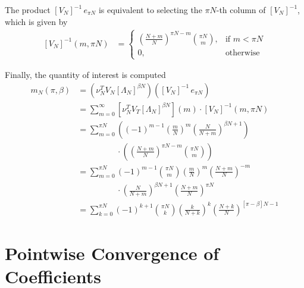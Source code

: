 \documentclass{article}
\newcommand{\ppar}[1]{\left( #1 \right)}
\newcommand{\spar}[1]{\left[ #1 \right]}
\begin{document}
The product $\spar{V_N}^{-1}\,e_{\pi N}$ is equivalent to selecting the $\pi N$-th column of $\spar{V_N}^{-1}$, which is given by
\begin{align}
\spar{V_N}^{-1}(m, \pi N)
    &=
    \begin{cases}
        \ppar{\frac{N+m}{N}}^{\pi N-m} \binom{\pi N}{m},
        &\text{if } m<\pi N \\
        0, &\text{otherwise}
    \end{cases}
\end{align}


Finally, the quantity of interest is computed
\begin{align*}
    m_N(\pi, \beta) 
    &=
    \ppar{\nu_N^T V_N \spar{\Lambda_N}^{\beta N}} \ppar{\spar{V_N}^{-1}\,e_{\pi N}}
    \\
    &=
    \sum_{m=0}^\infty 
    \spar{\nu_N^T V_T \spar{\Lambda_N}^{\beta N}}(m) \cdot
    \spar{V_N}^{-1}(m, \pi N)
    \\
    &=
    \sum_{m=0}^{\pi N}
    \ppar{(-1)^{m-1} \ppar{\frac{m}{N}}^m
    \ppar{\frac{N}{N+m}}^{\beta N+1}}
    \\
    &\phantom{=}
    \phantom{\sum_{m=0}^{\pi N}} \cdot
    \ppar{\ppar{\frac{N+m}{N}}^{\pi N-m} \binom{\pi N}{m}}
    \\
    &=
    \sum_{m=0}^{\pi N}
    (-1)^{m-1} \binom{\pi N}{m}
    \ppar{\frac{m}{N}}^m \ppar{\frac{N+m}{N}}^{-m}
    \\
    &\phantom{=}
    \phantom{\sum_{m=0}^{\pi N}} \cdot
    \ppar{\frac{N}{N+m}}^{\beta N+1}
    \ppar{\frac{N+m}{N}}^{\pi N}
    \\
    &=
    \sum_{k=0}^{\pi N}
    (-1)^{k+1} 
    \binom{\pi N}{k}
    \ppar{\frac{k}{N+k}}^k
    \ppar{\frac{N+k}{N}}^{\spar{\pi-\beta} N -1}
\end{align*}

\section{Pointwise Convergence of Coefficients}
\label{ap:coeff}
\end{document}
